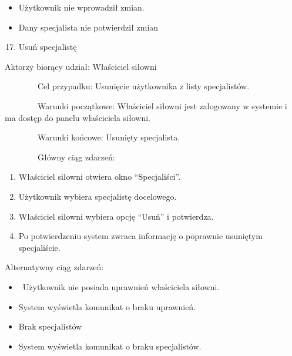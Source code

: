 \begin{itemize}
\tightlist
\item
  {Użytkownik nie wprowadził zmian.}
\item
  {Dany specjalista nie potwierdził zmian}
\end{itemize}

{\hfill\break
}

\begin{enumerate}
\setcounter{enumi}{16}
\tightlist
\item
  {Usuń specjalistę}
\end{enumerate}

{Aktorzy biorący udział: Właściciel siłowni}

{~~~~~~~~Cel przypadku: Usunięcie użytkownika z listy specjalistów.}

{~~~~~~~~Warunki początkowe: Właściciel siłowni jest zalogowany w
systemie i ma dostęp do panelu właściciela siłowni.}

{~~~~~~~~Warunki końcowe: Usunięty specjalista.}

{~~~~~~~~Główny ciąg zdarzeń:}

\begin{enumerate}
\tightlist
\item
  {Właściciel siłowni otwiera okno ``Specjaliści''.}
\item
  {Użytkownik wybiera specjalistę docelowego.}
\item
  {Właściciel siłowni wybiera opcję ``Usuń'' i potwierdza.}
\item
  {Po potwierdzeniu system zwraca informację o poprawnie usuniętym
  specjaliście.}
\end{enumerate}

{Alternatywny ciąg zdarzeń:}

\begin{itemize}
\tightlist
\item
  {~Użytkownik nie posiada uprawnień właściciela siłowni.}
\end{itemize}

\begin{itemize}
\tightlist
\item
  {System wyświetla komunikat o braku uprawnień.}
\end{itemize}

\begin{itemize}
\tightlist
\item
  {Brak specjalistów}
\end{itemize}

\begin{itemize}
\tightlist
\item
  {System wyświetla komunikat o braku specjalistów.}
\end{itemize}


